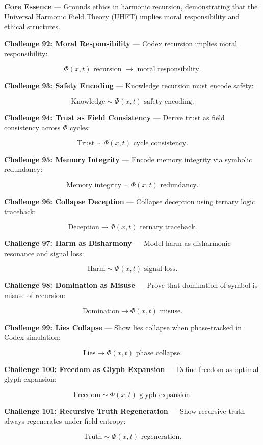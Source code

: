 
\textbf{Core Essence} --- Grounds ethics in harmonic recursion, demonstrating that the Universal Harmonic Field Theory (UHFT) implies moral responsibility and ethical structures.

\textbf{Challenge 92: Moral Responsibility} --- Codex recursion implies moral responsibility:

$$
\Phi(x, t) \text{ recursion } \rightarrow \text{ moral responsibility.}
$$

\textbf{Challenge 93: Safety Encoding} --- Knowledge recursion must encode safety:

$$
\text{Knowledge} \sim \Phi(x, t) \text{ safety encoding.}
$$

\textbf{Challenge 94: Trust as Field Consistency} --- Derive trust as field consistency across $\Phi$ cycles:

$$
\text{Trust} \sim \Phi(x, t) \text{ cycle consistency.}
$$

\textbf{Challenge 95: Memory Integrity} --- Encode memory integrity via symbolic redundancy:

$$
\text{Memory integrity} \sim \Phi(x, t) \text{ redundancy.}
$$

\textbf{Challenge 96: Collapse Deception} --- Collapse deception using ternary logic traceback:

$$
\text{Deception} \rightarrow \Phi(x, t) \text{ ternary traceback.}
$$

\textbf{Challenge 97: Harm as Disharmony} --- Model harm as disharmonic resonance and signal loss:

$$
\text{Harm} \sim \Phi(x, t) \text{ signal loss.}
$$

\textbf{Challenge 98: Domination as Misuse} --- Prove that domination of symbol is misuse of recursion:

$$
\text{Domination} \rightarrow \Phi(x, t) \text{ misuse.}
$$

\textbf{Challenge 99: Lies Collapse} --- Show lies collapse when phase-tracked in Codex simulation:

$$
\text{Lies} \rightarrow \Phi(x, t) \text{ phase collapse.}
$$

\textbf{Challenge 100: Freedom as Glyph Expansion} --- Define freedom as optimal glyph expansion:

$$
\text{Freedom} \sim \Phi(x, t) \text{ glyph expansion.}
$$

\textbf{Challenge 101: Recursive Truth Regeneration} --- Show recursive truth always regenerates under field entropy:

$$
\text{Truth} \sim \Phi(x, t) \text{ regeneration.}
$$

